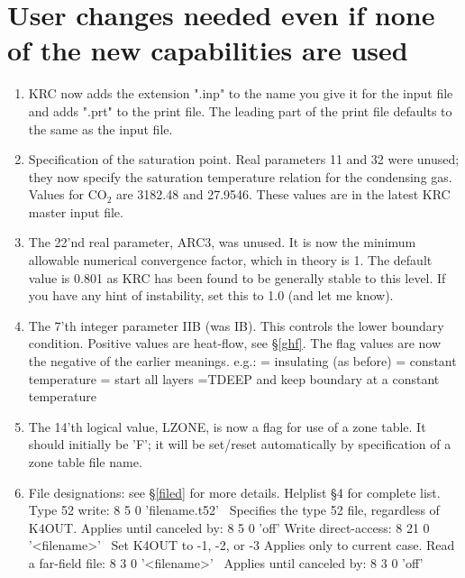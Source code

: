 \documentclass{article}
\begin{document}
\section {User changes needed even if none of the new capabilities are used \label{need}}
\begin{enumerate}    %


\item  KRC now adds the extension ".inp" to the name you give it for
  the input file and adds ".prt" to the print file.
  The leading part of the print file defaults to the same as the input file.

\item Specification of the saturation point. Real parameters 11 and 32 were
  unused; they now specify the saturation temperature relation for the
  condensing gas. Values for CO$_2$ are 3182.48 and 27.9546. These values are in
  the latest KRC master input file.

\item The 22'nd real parameter, ARC3, was unused. It is now the minimum
  allowable numerical convergence factor, which in theory is 1. The default
  value is 0.801 as KRC has been found to be generally stable to this level. If
  you have any hint of instability, set this to 1.0 (and let me know).

 \item The 7'th integer parameter IIB (was IB). This controls the lower boundary
   condition. Positive values are heat-flow, see \S \ref{ghf}. The flag values
   are now the negative of the earlier meanings. e.g.:
 = insulating (as before)
 = constant temperature 
 = start all layers =TDEEP and keep boundary at a constant temperature 

\item The 14'th logical value, LZONE, is now a flag for use of a zone table. It
  should initially be 'F'; it will be set/reset automatically by specification
  of a zone table file name.

\item File designations: see \S \ref{filed} for more details. Helplist \S 4 for complete list.
\qi Type 52 write: 8 5 0 'filename.t52' \ Specifies the type 52 file, regardless of K4OUT.  Applies until canceled by: 8 5 0 'off'
\qi  Write direct-access: 8 21 0 '<filename>' \ Set K4OUT to -1, -2, or -3
\qii Applies only to current case. 
\qi Read a far-field file:  8  3 0 '<filename>' \ Applies until canceled by: 8 3 0 'off'

\end{enumerate}
\end{document}
